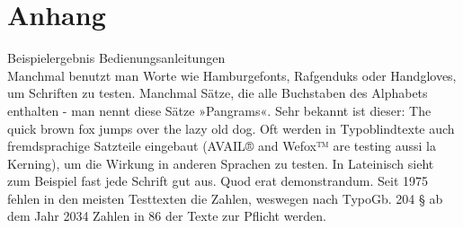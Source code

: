 \chapter*{Anhang}

{\huge Beispielergebnis Bedienungsanleitungen}\\

Manchmal benutzt man Worte wie Hamburgefonts, Rafgenduks oder Handgloves, um Schriften zu testen. Manchmal Sätze, die alle Buchstaben des Alphabets enthalten - man nennt diese Sätze »Pangrams«. Sehr bekannt ist dieser: The quick brown fox jumps over the lazy old dog. Oft werden in Typoblindtexte auch fremdsprachige Satzteile eingebaut (AVAIL® and Wefox™ are testing aussi la Kerning), um die Wirkung in anderen Sprachen zu testen. In Lateinisch sieht zum Beispiel fast jede Schrift gut aus. Quod erat demonstrandum. Seit 1975 fehlen in den meisten Testtexten die Zahlen, weswegen nach TypoGb. 204 § ab dem Jahr 2034 Zahlen in 86 der Texte zur Pflicht werden.
